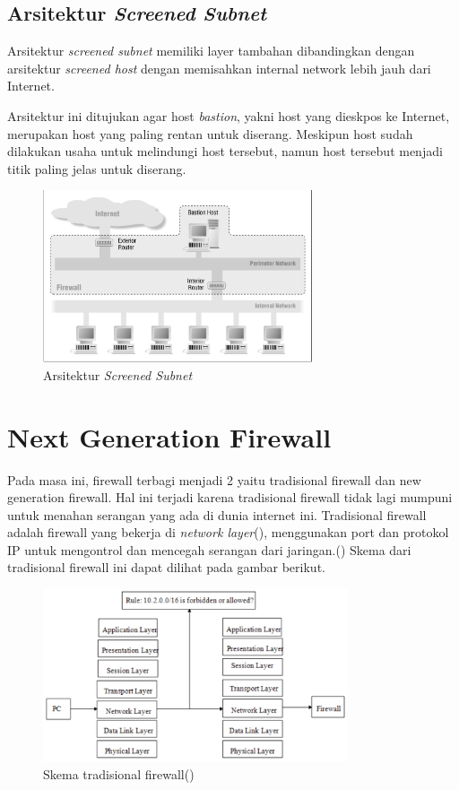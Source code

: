 \subsection{Arsitektur \textit{Screened Subnet}}

Arsitektur \textit{screened subnet} memiliki layer tambahan dibandingkan dengan arsitektur \textit{screened host} dengan memisahkan internal network lebih jauh dari Internet.

Arsitektur ini ditujukan agar host \textit{bastion}, yakni host yang dieskpos ke Internet, merupakan host yang paling rentan untuk diserang. Meskipun host sudah dilakukan usaha untuk melindungi host tersebut, namun host tersebut menjadi titik paling jelas untuk diserang.

\begin{figure}[H]
	\centering
	\includegraphics[width=300px]{resources/screened_subnet.png}
	\caption{Arsitektur \textit{Screened Subnet}}
	\label{fig:screened_subnet}
\end{figure}

\section{Next Generation Firewall}
Pada masa ini, firewall terbagi menjadi 2 yaitu tradisional firewall dan new generation firewall. Hal ini terjadi karena tradisional firewall tidak lagi mumpuni untuk menahan serangan yang ada di dunia internet ini. 
Tradisional firewall adalah firewall yang bekerja di \textit{network layer}(\cite{nicoll2004challenges}), menggunakan port dan protokol IP untuk mengontrol dan mencegah serangan dari jaringan.(\cite{zhong2012design}) Skema dari tradisional firewall ini dapat dilihat pada gambar berikut.
\begin{figure}[H]
	\centering
	\includegraphics[width=0.8\textwidth]{resources/tradisional_firewall.png}
	\caption{Skema tradisional firewall(\cite{zhong2012design})}
	\label{fig:tradisional_firewall}
\end{figure}

